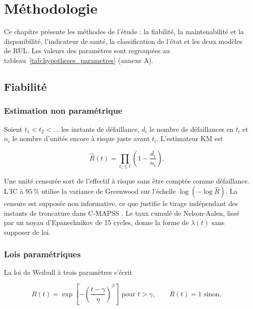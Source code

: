 \chapter{Méthodologie}\label{sec:methodologie}

\chapintro

Ce chapitre présente les méthodes de l'étude : la fiabilité, la maintenabilité et la disponibilité, l'indicateur de santé, la classification de l'état et les deux modèles de RUL. Les valeurs des paramètres sont regroupées au tableau~\ref{tab:hypotheses_parametres} (annexe A).

\section{Fiabilité}\label{sec:fiabilite}

\subsection{Estimation non paramétrique}

Soient $t_1 < t_2 < \dots$ les instants de défaillance, $d_i$ le nombre de défaillances en $t_i$ et $n_i$ le nombre d'unités encore à risque juste avant $t_i$. L'estimateur KM \cite{kaplanmeier1958} est

\begin{equation}\label{eq:km}
\hat R(t) = \prod_{t_i \le t} \left(1 - \frac{d_i}{n_i}\right).
\end{equation}

Une unité censurée sort de l'effectif à risque sans être comptée comme défaillance. L'IC à $95\,\%$ utilise la variance de Greenwood \cite{greenwood1926} sur l'échelle $\log(-\log \hat R)$. La censure est supposée non informative, ce que justifie le tirage indépendant des instants de troncature dans C-MAPSS \cite{saxena2008damage}. Le taux cumulé de Nelson-Aalen, lissé par un noyau d'Epanechnikov de 15 cycles, donne la forme de $\lambda(t)$ sans supposer de loi.

\subsection{Lois paramétriques}

La loi de Weibull à trois paramètres \cite{weibull1951} s'écrit

\begin{equation}\label{eq:weibull3}
R(t) = \exp\!\left[-\left(\frac{t-\gamma}{\eta}\right)^{\beta}\right] \text{ pour } t > \gamma, \qquad R(t) = 1 \text{ sinon},
\end{equation}

